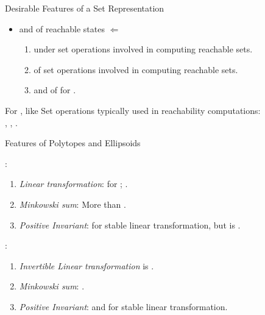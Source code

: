 \begin{frame}{Desirable Features of a Set Representation}
\begin{itemize}
\item {} and  of  reachable states $\Leftarrow$
\begin{enumerate}
\item {} under set operations involved in computing reachable sets.
\item {} of set operations involved in computing reachable sets.
\item {} and  of  for .
\end{enumerate}
\end{itemize}
\pause
%
For , like 
%
Set operations typically used in reachability computations:\\
, , .
\end{frame}


\begin{frame}{Features of Polytopes and Ellipsoids}
%
\begin{minipage}{0.48\textwidth}
\underline{}:
\begin{enumerate}
\item \emph{Linear transformation}:  for ;
.
\item \emph{Minkowski sum}: More than .
\item \emph{Positive Invariant}:  for stable linear
transformation, but  is .
\end{enumerate}
\end{minipage}
%
\begin{minipage}{0.48\textwidth}
\underline{}:
%
\begin{enumerate}
\item \emph{Invertible Linear transformation} is .
\item \emph{Minkowski sum}: .
\item \emph{Positive Invariant}: 
and  for stable linear transformation.
\end{enumerate}
%
\end{minipage}
%
\end{frame}

